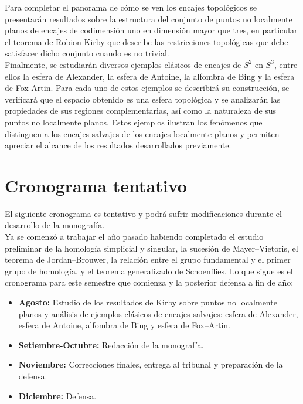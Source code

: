 \documentclass[11pt]{article}
\begin{document}
Para completar el panorama de cómo se ven los encajes topológicos se presentarán resultados sobre la estructura del conjunto de puntos no localmente planos de encajes de codimensión uno en dimensión mayor que tres, en particular el teorema de Robion Kirby que describe las restricciones topológicas que debe satisfacer dicho conjunto cuando es no trivial.\\

Finalmente, se estudiarán diversos ejemplos clásicos de encajes de $S^{2}$ en
$S^{3}$, entre ellos la esfera de Alexander, la esfera de Antoine, la alfombra
de Bing y la esfera de Fox-Artin. Para cada uno de estos ejemplos se describirá
su construcción, se verificará que el espacio obtenido es una esfera topológica
y se analizarán las propiedades de sus regiones complementarias, así como la
naturaleza de sus puntos no localmente planos. Estos ejemplos ilustran los
fenómenos que distinguen a los encajes salvajes de los encajes localmente planos
y permiten apreciar el alcance de los resultados desarrollados previamente.\\


\section*{Cronograma tentativo}

El siguiente cronograma es tentativo y podrá sufrir modificaciones durante el
desarrollo de la monografía.\\

Ya se comenz\'o a trabajar el a\~no pasado habiendo completado el estudio preliminar de la homología simplicial y singular, la sucesión de Mayer--Vietoris, el teorema de
    Jordan--Brouwer, la relación entre el grupo fundamental y el primer grupo de
    homología, y el teorema generalizado de Schoenflies.  Lo que sigue es el cronograma para este semestre que comienza y la posterior defensa a fin de a\~no:

\begin{itemize}
    \item \textbf{Agosto:}  Estudio de los resultados de Kirby sobre puntos no
    localmente planos y análisis de ejemplos clásicos de encajes salvajes:
    esfera de Alexander, esfera de Antoine, alfombra de Bing y esfera de
    Fox--Artin.


   \item \textbf{Setiembre-Octubre:} Redacción de la monografía.
   
    
\item \textbf{Noviembre:} Correcciones finales, entrega al tribunal y
    preparación de la defensa.
    
    \item \textbf{Diciembre:} Defensa.

    
\end{itemize}
\end{document}
